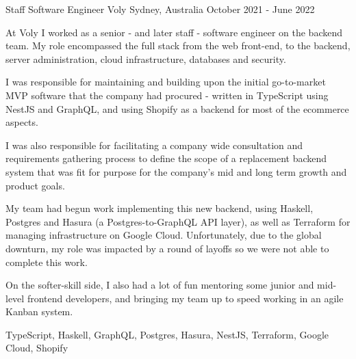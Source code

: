 \begin{cventries}


\cventry
{Staff Software Engineer} %
{Voly} %
{Sydney, Australia} %
{October 2021 - June 2022} %
{ %
\begin{cvitems}
  \item {At Voly I worked as a senior - and later staff - software engineer on the backend team. My role encompassed the full stack from the web front-end, to the backend, server administration, cloud infrastructure, databases and security.}
  \item {I was responsible for maintaining and building upon the initial go-to-market MVP software that the company had procured - written in TypeScript using NestJS and GraphQL, and using Shopify as a backend for most of the ecommerce aspects.}
  \item {I was also responsible for facilitating a company wide consultation and requirements gathering process to define the scope of a replacement backend system that was fit for purpose for the company's mid and long term growth and product goals.}
  \item {My team had begun work implementing this new backend, using Haskell, Postgres and Hasura (a Postgres-to-GraphQL API layer), as well as Terraform for managing infrastructure on Google Cloud. Unfortunately, due to the global downturn, my role was impacted by a round of layoffs so we were not able to complete this work.}
  \item {On the softer-skill side, I also had a lot of fun mentoring some junior and mid-level frontend developers, and bringing my team up to speed working in an agile Kanban system.}
\end{cvitems}
}
{TypeScript, Haskell, GraphQL, Postgres, Hasura, NestJS, Terraform, Google Cloud, Shopify}




\end{cventries}

